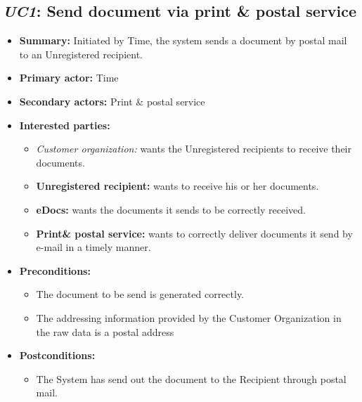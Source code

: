 \documentclass[a4paper,10pt]{article}
\begin{document}
\subsection{\emph{UC1}: Send document via print \& postal service}
\begin{itemize}
    \item \textbf{Summary:} Initiated by Time, the system sends a document by postal mail to an Unregistered recipient.
    \item \textbf{Primary actor:} Time
	\item \textbf{Secondary actors:} Print \& postal service
    \item \textbf{Interested parties:} 
        \begin{itemize}
            \item \textit{Customer organization:} wants the Unregistered recipients to receive their documents.
            \item \textbf{Unregistered recipient:} wants to receive his or her documents.
            \item \textbf{eDocs:} wants the documents it sends to be correctly received.
            \item \textbf{Print\& postal service:} wants to correctly deliver documents it send by e-mail in a timely manner.
        \end{itemize}

    \item \textbf{Preconditions:}
        \begin{itemize}
            \item The document to be send is generated correctly.
            \item The addressing information provided by the Customer Organization in the raw data is a postal address 
        \end{itemize}

    \item \textbf{Postconditions:}
        \begin{itemize}
            \item The System has send out the document to the Recipient through postal mail.
        \end{itemize}
        

\end{itemize}
\end{document}
